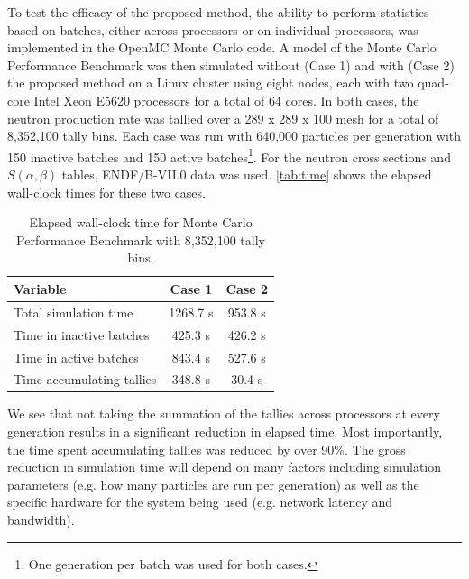 To test the efficacy of the proposed method, the ability to perform statistics
based on batches, either across processors or on individual processors, was
implemented in the OpenMC Monte Carlo code. A model of the Monte Carlo
Performance Benchmark \cite{mc-hoogenboom-2011} was then simulated without (Case
1) and with (Case 2) the proposed method on a Linux cluster using eight nodes,
each with two quad-core Intel Xeon E5620 processors for a total of 64 cores. In
both cases, the neutron production rate was tallied over a 289 x 289 x 100 mesh
for a total of 8,352,100 tally bins. Each case was run with 640,000 particles
per generation with 150 inactive batches and 150 active batches\footnote{One
  generation per batch was used for both cases.}. For the neutron cross sections
and $S(\alpha,\beta)$ tables, ENDF/B-VII.0 data was used. \autoref{tab:time}
shows the elapsed wall-clock times for these two cases.
\begin{table}[htb]
  \centering
  \caption{Elapsed wall-clock time for Monte Carlo Performance Benchmark with
    8,352,100 tally bins.}
  \label{tab:time}
  \begin{tabular}{lcc}
    \toprule
    Variable & Case 1 & Case 2 \\
    \midrule
    Total simulation time     & 1268.7 s & 953.8 s \\
    Time in inactive batches  &  425.3 s & 426.2 s \\
    Time in active batches    &  843.4 s & 527.6 s \\
    Time accumulating tallies &  348.8 s &  30.4 s \\
    \bottomrule
  \end{tabular}
\end{table}
We see that not taking the summation of the tallies across processors at every
generation results in a significant reduction in elapsed time. Most importantly,
the time spent accumulating tallies was reduced by over 90\%. The gross
reduction in simulation time will depend on many factors including simulation
parameters (e.g. how many particles are run per generation) as well as the
specific hardware for the system being used (e.g. network latency and
bandwidth).

